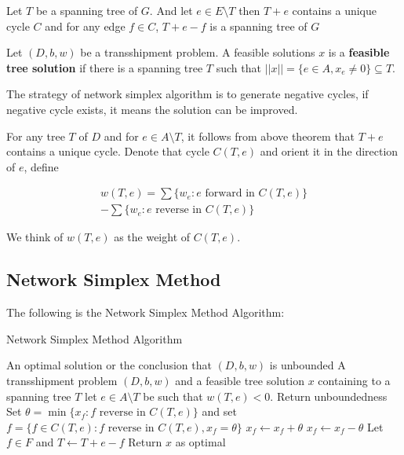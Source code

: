 			\begin{theorem}
				Let $T$ be a spanning tree of $G$. And let $e\in E\setminus T$ then $T+e$ contains a unique cycle $C$ and for any edge $f\in C$, $T+e-f$ is a spanning tree of $G$
			\end{theorem}

			Let $(D, b, w)$ be a transshipment problem. A feasible solutions $x$ is a \textbf{feasible tree solution} if there is a spanning tree $T$ such that $||x|| = \{e\in A, x_e\neq 0\} \subseteq T$.

			The strategy of network simplex algorithm is to generate negative cycles, if negative cycle exists, it means the solution can be improved.

			For any tree $T$ of $D$ and for $e\in A\setminus T$, it follows from above theorem that $T+e$ contains a unique cycle. Denote that cycle $C(T, e)$ and orient it in the direction of $e$, define 

			\begin{eqnarray}
				w(T, e) = \sum\{w_e: e \text{ forward in } C(T, e)\} \nonumber \\ 
						- \sum\{w_e: e \text{ reverse in } C(T, e)\}
			\end{eqnarray}

			We think of $w(T, e)$ as the weight of $C(T,e)$.

			\subsection{Network Simplex Method}
				The following is the Network Simplex Method Algorithm:

				\begin{algorithm}
					\caption{Network Simplex Method Algorithm}
					\begin{algorithmic}
						\ENSURE An optimal solution or the conclusion that $(D, b, w)$ is unbounded
						\REQUIRE A transshipment problem $(D, b, w)$ and a feasible tree solution $x$ containing to a spanning tree $T$
							\STATE let $e \in A \setminus T$ be such that $w(T, e) < 0$.
								\STATE Return unboundedness
							\ELSE
								\STATE Set $\theta = \min\{x_f: f \text{ reverse in } C(T, e)\}$ and set $f = \{f\in C(T, e): f \text{ reverse in } C(T, e), x_f = \theta\}$
									\STATE $x_f \gets x_f + \theta$
								\ELSE
									\STATE $x_f \gets x_f - \theta$
								\ENDIF
								\STATE Let $f \in F$ and $T \gets T+e-f$
							\ENDIF
						\ENDWHILE
						\STATE Return $x$ as optimal					
					\end{algorithmic}
				\end{algorithm}

